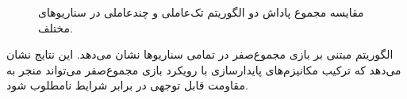 \begin{figure}[H]
	
	\caption{مقایسه مجموع پاداش دو الگوریتم تک‌عاملی و چندعاملی  در سناریوهای مختلف. 
		}
	\label{fig:td3_robustness_violin}
\end{figure}

الگوریتم  مبتنی بر بازی مجموع‌صفر در تمامی سناریوها نشان می‌دهد. 
این نتایج نشان می‌دهد که ترکیب مکانیزم‌های پایدارسازی  با رویکرد بازی مجموع‌صفر می‌تواند منجر به مقاومت قابل توجهی در برابر شرایط نامطلوب شود.





